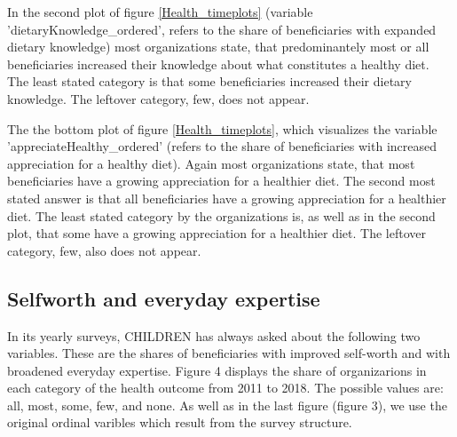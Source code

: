 \documentclass[12pt, a4paper, titlepage]{article}\usepackage[]{graphicx}\usepackage[]{color}
\begin{document}
In the second plot of figure \ref{Health_timeplots} (variable 'dietaryKnowledge_ordered', refers to the share of beneficiaries with expanded dietary knowledge) most organizations state, that predominantely most or all beneficiaries increased their knowledge about what constitutes a healthy diet. The least stated category is that some beneficiaries increased their dietary knowledge. The leftover category, few, does not appear.

The the bottom plot of figure \ref{Health_timeplots}, which visualizes the variable 'appreciateHealthy_ordered' (refers to the share of beneficiaries with increased appreciation for a healthy diet). Again most organizations state, that most beneficiaries have a growing appreciation for a healthier diet. The second most stated answer is that all beneficiaries have a growing appreciation for a healthier diet. The least stated category by the organizations is, as well as in the second plot, that some have a growing appreciation for a healthier diet. The leftover category, few, also does not appear.


\subsection{Selfworth and everyday expertise} 

In its yearly surveys, CHILDREN has always asked about the following two variables. These are the shares of beneficiaries with improved self-worth and with broadened everyday expertise. Figure 4 displays the share of organizarions in each category of the health outcome from 2011 to 2018. The possible values are: all, most, some, few, and none. As well as in the last figure (figure 3), we use the original ordinal varibles which result from the survey structure.
\end{document}
